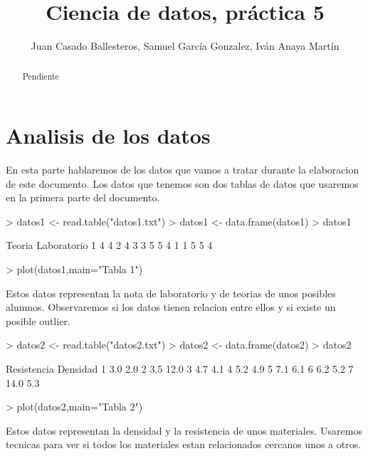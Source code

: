 \documentclass [a4paper] {article}
\title{Ciencia de datos, práctica 5}
\author{Juan Casado Ballesteros, Samuel García Gonzalez, Iván Anaya Martín}
\begin{document}
\maketitle

\begin{abstract}
Pendiente
\end{abstract}

\newpage

\newpage
\section{Analisis de los datos}

En esta parte hablaremos de los datos que vamos a tratar durante la elaboracion de este documento.
Los datos que tenemos son dos tablas de datos que usaremos en la primera parte del documento. 

\begin{Schunk}
\begin{Sinput}
> datos1 <- read.table("datos1.txt")
> datos1 <- data.frame(datos1)
> datos1
\end{Sinput}
\begin{Soutput}
  Teoria Laboratorio
1      4           4
2      4           3
3      5           5
4      1           1
5      5           4
\end{Soutput}
\begin{Sinput}
> plot(datos1,main="Tabla 1")
\end{Sinput}
\end{Schunk}

Estos datos representan la nota de laboratorio y de teorias de unos posibles alumnos. Observaremos si
los datos tienen relacion entre ellos y si existe un posible outlier. 

\begin{Schunk}
\begin{Sinput}
> datos2 <- read.table("datos2.txt")
> datos2 <- data.frame(datos2)
> datos2
\end{Sinput}
\begin{Soutput}
  Resistencia Densidad
1         3.0      2.0
2         3.5     12.0
3         4.7      4.1
4         5.2      4.9
5         7.1      6.1
6         6.2      5.2
7        14.0      5.3
\end{Soutput}
\begin{Sinput}
> plot(datos2,main="Tabla 2")
\end{Sinput}
\end{Schunk}

Estos datos representan la densidad y la resistencia de unos materiales. Usaremos tecnicas para ver 
si todos los materiales estan relacionados cercanos unos a otros.
\end{document}
